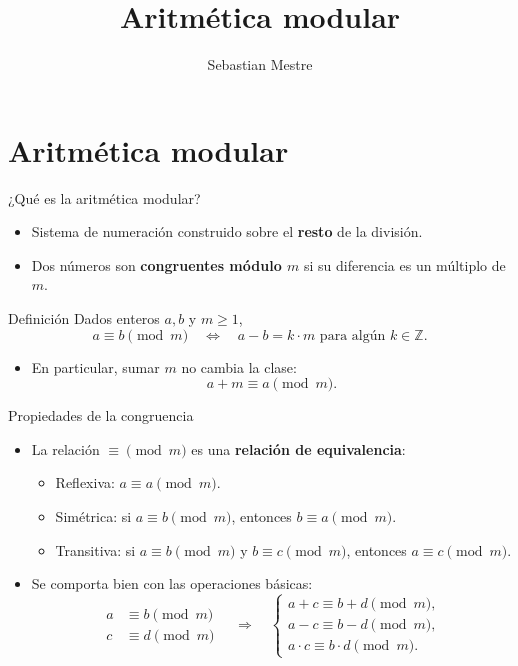 \documentclass[aspectratio=169]{beamer}
\title{Aritmética modular}
\author{Sebastian Mestre}
\date{}
\begin{document}
\begin{frame}
  \titlepage
\end{frame}

\section{Aritmética modular}

\begin{frame}{¿Qué es la aritmética modular?}
  \begin{itemize}
    \item Sistema de numeración construido sobre el \textbf{resto} de la división.
    \item Dos números son \textbf{congruentes módulo \(m\)} si su diferencia es un múltiplo de \(m\).
  \end{itemize}
  \begin{block}{Definición}
    Dados enteros \(a,b\) y \(m \ge 1\),
    \[
      a \equiv b \pmod m
      \quad \Leftrightarrow \quad
      a - b = k \cdot m \text{ para algún } k \in \mathbb{Z}.
    \]
  \end{block}
  \begin{itemize}
    \item En particular, sumar \(m\) no cambia la clase:
      \[
        a + m \equiv a \pmod m.
      \]
  \end{itemize}
\end{frame}

\begin{frame}{Propiedades de la congruencia}
  \begin{itemize}
    \item La relación \(\equiv \pmod m\) es una \textbf{relación de equivalencia}:
      \begin{itemize}
        \item Reflexiva: \(a \equiv a \pmod m\).
        \item Simétrica: si \(a \equiv b \pmod m\), entonces \(b \equiv a \pmod m\).
        \item Transitiva: si \(a \equiv b \pmod m\) y \(b \equiv c \pmod m\), entonces \(a \equiv c \pmod m\).
      \end{itemize}
    \item Se comporta bien con las operaciones básicas:
      \[
        \begin{aligned}
          a &\equiv b \pmod m \\
          c &\equiv d \pmod m
        \end{aligned}
        \quad \Rightarrow \quad
        \begin{cases}
          a + c \equiv b + d \pmod m,\\
          a - c \equiv b - d \pmod m,\\
          a \cdot c \equiv b \cdot d \pmod m.
        \end{cases}
      \]
  \end{itemize}
\end{frame}
\end{document}
